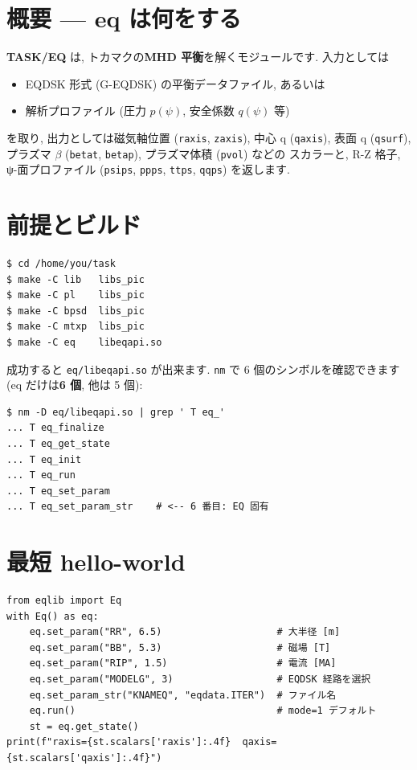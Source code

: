 \documentclass[11pt,a4paper]{report}
\begin{document}
\section{概要 — eq は何をする}

\textbf{TASK/EQ} は, トカマクの\textbf{MHD 平衡}を解くモジュールです.
入力としては
\begin{itemize}[leftmargin=1.5em]
  \item EQDSK 形式 (G-EQDSK) の平衡データファイル, あるいは
  \item 解析プロファイル (圧力 \(p(\psi)\), 安全係数 \(q(\psi)\) 等)
\end{itemize}
を取り, 出力としては磁気軸位置 (\texttt{raxis}, \texttt{zaxis}),
中心 q (\texttt{qaxis}), 表面 q (\texttt{qsurf}), プラズマ \(\beta\)
(\texttt{betat}, \texttt{betap}), プラズマ体積 (\texttt{pvol}) などの
スカラーと, R-Z 格子, ψ-面プロファイル (\texttt{psips},
\texttt{ppps}, \texttt{ttps}, \texttt{qqps}) を返します.

\section{前提とビルド}

\begin{lstlisting}[style=bash,caption={eq モジュールのライブラリビルド}]
$ cd /home/you/task
$ make -C lib   libs_pic
$ make -C pl    libs_pic
$ make -C bpsd  libs_pic
$ make -C mtxp  libs_pic
$ make -C eq    libeqapi.so
\end{lstlisting}

成功すると \texttt{eq/libeqapi.so} が出来ます. \texttt{nm} で
6 個のシンボルを確認できます (eq だけは\textbf{6 個}, 他は 5 個):

\begin{lstlisting}[style=bash]
$ nm -D eq/libeqapi.so | grep ' T eq_'
... T eq_finalize
... T eq_get_state
... T eq_init
... T eq_run
... T eq_set_param
... T eq_set_param_str    # <-- 6 番目: EQ 固有
\end{lstlisting}

\section{最短 hello-world}

\begin{lstlisting}[style=py,caption={\texttt{eqlib} 最小例 — EQDSK 読込}]
from eqlib import Eq
with Eq() as eq:
    eq.set_param("RR", 6.5)                    # 大半径 [m]
    eq.set_param("BB", 5.3)                    # 磁場 [T]
    eq.set_param("RIP", 1.5)                   # 電流 [MA]
    eq.set_param("MODELG", 3)                  # EQDSK 経路を選択
    eq.set_param_str("KNAMEQ", "eqdata.ITER")  # ファイル名
    eq.run()                                   # mode=1 デフォルト
    st = eq.get_state()
print(f"raxis={st.scalars['raxis']:.4f}  qaxis={st.scalars['qaxis']:.4f}")
\end{lstlisting}
\end{document}
